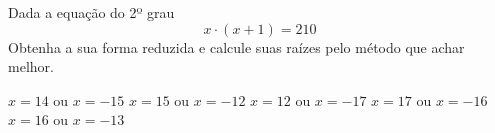 Dada a equação do 2º grau
\[x\cdot (x+1)=210\]
Obtenha a sua forma reduzida e calcule suas raízes pelo método que achar melhor.

$x=14$ ou $x=-15$
$x=15$ ou $x=-12$
$x=12$ ou $x=-17$
$x=17$ ou $x=-16$
$x=16$ ou $x=-13$



